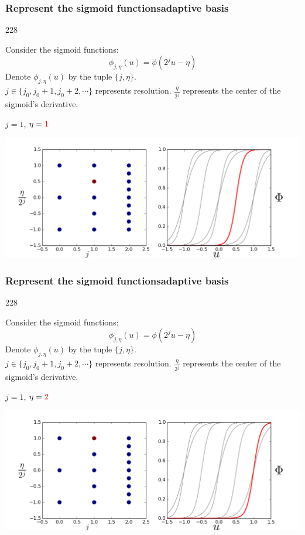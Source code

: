 \documentclass{beamer}
\newcommand{\barrow}{\item[\color{darkred}\ding{228}]}
\begin{document}
\setcounter{framenumber}{15} 
\begin{frame}
    \frametitle{Represent the sigmoid functions\hfill \scriptsize{adaptive basis}}\small
    \begin{dinglist}{228}
        \barrow
        Consider the sigmoid functions:
        $$
            \phi_{j, \eta}(u) = \phi(2^j u - \eta)
        $$
        Denote $\phi_{j, \eta}(u)$ by the tuple $\{j, \eta\}$.\\
        \vspace{.2cm}
        $j\in \{j_0, j_0+1, j_0+2, \cdots \}$ represents resolution. $\frac{\eta}{2^j}$ represents
        the center of the sigmoid's derivative.
        \barrow $j=1$, $\eta=\textcolor{red}{1}$\\
        \begin{center}
            \includegraphics[width=10.cm]{basis_6.png}
        \end{center}
    \end{dinglist}
\end{frame}

\setcounter{framenumber}{15} 
\begin{frame}
    \frametitle{Represent the sigmoid functions\hfill \scriptsize{adaptive basis}}\small
    \begin{dinglist}{228}
        \barrow
        Consider the sigmoid functions:
        $$
            \phi_{j, \eta}(u) = \phi(2^j u - \eta)
        $$
        Denote $\phi_{j, \eta}(u)$ by the tuple $\{j, \eta\}$.\\
        \vspace{.2cm}
        $j\in \{j_0, j_0+1, j_0+2, \cdots \}$ represents resolution. $\frac{\eta}{2^j}$ represents
        the center of the sigmoid's derivative.
        \barrow $j=1$, $\eta=\textcolor{red}{2}$\\
        \begin{center}
            \includegraphics[width=10.cm]{basis_7.png}
        \end{center}
    \end{dinglist}
\end{frame}
\end{document}
